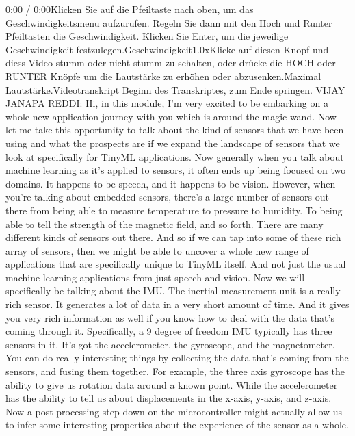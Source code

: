     0:00 / 0:00Klicken Sie auf die Pfeiltaste nach oben, um das Geschwindigkeitsmenu aufzurufen. Regeln Sie dann mit den Hoch und Runter Pfeiltasten die Geschwindigkeit. Klicken Sie Enter, um die jeweilige Geschwindigkeit festzulegen.Geschwindigkeit1.0xKlicke auf diesen Knopf und diess Video stumm oder nicht stumm zu schalten, oder drücke die HOCH oder RUNTER Knöpfe um die Lautstärke zu erhöhen oder abzusenken.Maximal Lautstärke.Videotranskript
    Beginn des Transkriptes, zum Ende springen.
    VIJAY JANAPA REDDI: Hi, in this module, I'm
    very excited to be embarking on a whole new application journey with you which
    is around the magic wand.
    Now let me take this opportunity to talk about the kind of sensors
    that we have been using and what the prospects are
    if we expand the landscape of sensors that we look at specifically for TinyML
    applications.
    Now generally when you talk about machine
    learning as it's applied to sensors, it often
    ends up being focused on two domains.
    It happens to be speech, and it happens to be vision.
    However, when you're talking about embedded sensors,
    there's a large number of sensors out there
    from being able to measure temperature to pressure to humidity.
    To being able to tell the strength of the magnetic field, and so forth.
    There are many different kinds of sensors out there.
    And so if we can tap into some of these rich array of sensors,
    then we might be able to uncover a whole new range of applications that are
    specifically unique to TinyML itself.
    And not just the usual machine learning applications
    from just speech and vision.
    Now we will specifically be talking about the IMU.
    The inertial measurement unit is a really rich sensor.
    It generates a lot of data in a very short amount of time.
    And it gives you very rich information as well
    if you know how to deal with the data that's coming through it.
    Specifically, a 9 degree of freedom IMU typically has three sensors in it.
    It's got the accelerometer, the gyroscope, and the magnetometer.
    You can do really interesting things by collecting
    the data that's coming from the sensors, and fusing them together.
    For example, the three axis gyroscope has the ability
    to give us rotation data around a known point.
    While the accelerometer has the ability to tell us about
    displacements in the x-axis, y-axis, and z-axis.
    Now a post processing step down on the microcontroller
    might actually allow us to infer some interesting properties
    about the experience of the sensor as a whole.
